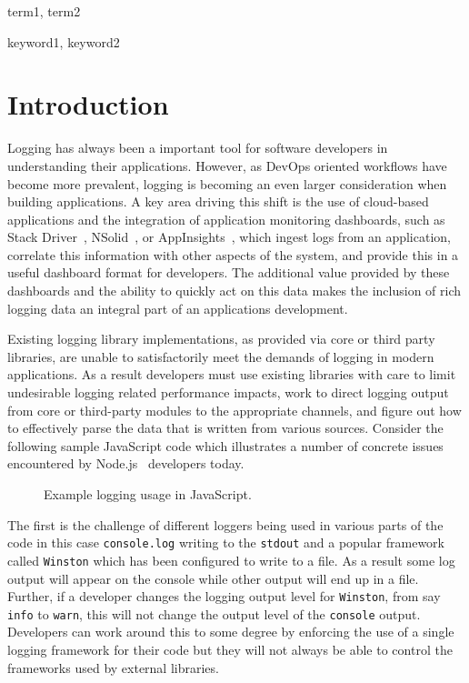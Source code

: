 \documentclass[preprint]{sig-alternate-05-2015}
\begin{document}
\terms
term1, term2

\keywords
keyword1, keyword2

\section{Introduction} 
\label{sec:intro}
Logging has always been a important tool for software developers in
understanding their applications. However, as DevOps oriented workflows have
become more prevalent, logging is becoming an even larger consideration when
building applications. A key area driving this shift is the use of cloud-based
applications and the integration of application monitoring dashboards, such as
Stack Driver~\cite{StackDriver}, NSolid~\cite{NSolid}, or
AppInsights~\cite{AppInsights}, which ingest logs from an application, correlate
this information with other aspects of the system, and provide this in a useful
dashboard format for developers. The additional value provided by these
dashboards and the ability to quickly act on this data makes the inclusion of
rich logging data an integral part of an applications development.

Existing logging library implementations, as provided via core or third party
libraries, are unable to satisfactorily meet the demands of logging in modern
applications. As a result developers must use existing libraries with care to
limit undesirable logging related performance impacts, work to direct logging
output from core or third-party modules to the appropriate channels, and figure
out how to effectively parse the data that is written from various sources.
Consider the following sample JavaScript code which illustrates a number of
concrete issues encountered by Node.js~\cite{Node} developers today.

\begin{figure*}[t]

\label{sec:introExample}
\caption{Example logging usage in JavaScript.}
\end{figure*}

The first is the challenge of different loggers being used in various parts of
the code in this case \texttt{console.log} writing to the \texttt{stdout} and a
popular framework called \texttt{Winston} which has been configured to write to
a file. As a result some log output will appear on the console while other
output will end up in a file. Further, if a developer changes the logging output
level for \texttt{Winston}, from say \texttt{info} to \texttt{warn}, this will
not change the output level of the \texttt{console} output. Developers can work
around this to some degree by enforcing the use of a single logging framework
for their code but they will not always be able to control the frameworks used
by external libraries.
\end{document}
